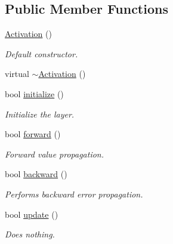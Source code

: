 \subsection*{Public Member Functions}
\begin{DoxyCompactItemize}
\item 
\hyperlink{classffnn_1_1layer_1_1_activation_a92e73d25dc6855597d25e2b492bd381c}{Activation} ()
\begin{DoxyCompactList}\small\item\em Default constructor. \end{DoxyCompactList}\item 
virtual \hyperlink{classffnn_1_1layer_1_1_activation_acd5aa2e208c0c85ea1ff8033133f8ebe}{$\sim$\-Activation} ()
\item 
bool \hyperlink{classffnn_1_1layer_1_1_activation_a10a733b3fc1378fd8d1f33d231ee3e83}{initialize} ()
\begin{DoxyCompactList}\small\item\em Initialize the layer. \end{DoxyCompactList}\item 
bool \hyperlink{classffnn_1_1layer_1_1_activation_a8435ed1feadfcfc2343dd65a1542fe23}{forward} ()
\begin{DoxyCompactList}\small\item\em Forward value propagation. \end{DoxyCompactList}\item 
bool \hyperlink{classffnn_1_1layer_1_1_activation_aa5166a595cb135c7ad62569361de101b}{backward} ()
\begin{DoxyCompactList}\small\item\em Performs backward error propagation. \end{DoxyCompactList}\item 
bool \hyperlink{classffnn_1_1layer_1_1_activation_a24a044458729f72466af06153851f5b2}{update} ()
\begin{DoxyCompactList}\small\item\em Does nothing. \end{DoxyCompactList}\end{DoxyCompactItemize}

